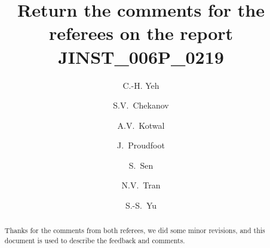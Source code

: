 \documentclass[final,1p,11pt]{elsarticle}
\begin{document}
\begin{frontmatter}

\title{
Return the comments for the referees on the report \\ JINST\_006P\_0219
}

\author[add3]{C.-H. Yeh}

\author[add1]{S.V.~Chekanov}

\author[addDuke]{A.V.~Kotwal}

\author[add1]{J.~Proudfoot}

\author[addDuke]{S.~Sen}

\author[add2]{N.V.~Tran}

\author[add3]{S.-S.~Yu}

\address[add3]{
Department of Physics and Center for High Energy and High Field Physics, 
National Central University, Chung-Li, Taoyuan City 32001, Taiwan
}

\address[add1]{
HEP Division, Argonne National Laboratory,
9700 S.~Cass Avenue,
Argonne, IL 60439, USA. 
}

\address[addDuke]{
Department of Physics, Duke University, USA
}

\address[add2]{
Fermi National Accelerator Laboratory
}




\begin{abstract}
Thanks for the comments from both referees, we did some minor revisions, and this document is used to describe the feedback and comments. 
\end{abstract}

\begin{keyword}
\end{keyword}

\end{frontmatter}
\end{document}
